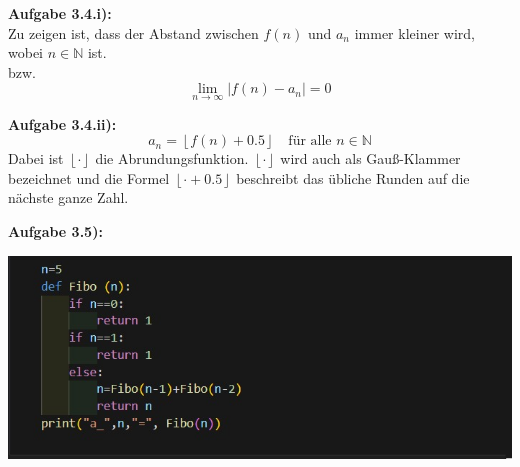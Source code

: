 \documentclass{beamer}
\begin{document}
\begin{frame}
\begin{flushleft}
\textbf{Aufgabe 3.4.i):} \\[1em]
Zu zeigen ist, dass der Abstand zwischen \( f(n) \) und \( a_n \) immer kleiner wird, wobei \( n \in \mathbb{N} \) ist.\\ bzw.
\\
\[
\lim_{n \to \infty} |f(n) - a_n|=0
\]
\end{flushleft}
\end{frame}
\begin{frame}
\textbf{Aufgabe 3.4.ii):} \\[1em]
\[
a_n = \left\lfloor f(n) + 0.5 \right\rfloor \quad \text{für alle } n \in \mathbb{N}
\]
Dabei ist \( \left\lfloor \cdot \right\rfloor \) die Abrundungsfunktion. \( \left\lfloor \cdot \right\rfloor \) wird auch als Gauß-Klammer bezeichnet und die Formel \( \left\lfloor \cdot + 0.5 \right\rfloor \) beschreibt das übliche Runden auf die nächste ganze Zahl.

\end{frame}



\begin{frame}
\textbf{Aufgabe 3.5):} \\[1em]

\begin{center}
       \includegraphics[width=1\textwidth]{code/3.5/3.5-00.png}
\end{center}
\end{frame}
\end{document}
